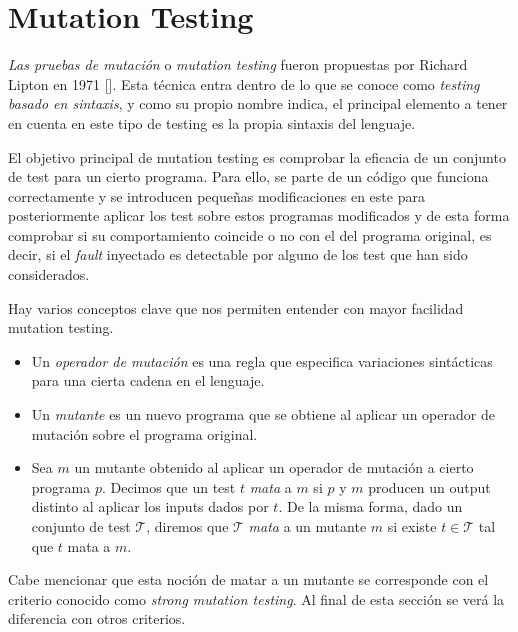\section{Mutation Testing}

\textit{Las pruebas de mutación} o \textit{mutation testing} fueron propuestas por Richard Lipton en 1971 [\cite{lipton1971fault}]. Esta técnica entra dentro de lo que se conoce como \textit{testing basado en sintaxis}, y como su propio nombre indica, el principal elemento a tener en cuenta en este tipo de testing es la propia sintaxis del lenguaje.

El objetivo principal de mutation testing es comprobar la eficacia de un conjunto de test para un cierto programa. Para ello, se parte de un código que funciona correctamente y se introducen pequeñas modificaciones en este para posteriormente aplicar los test sobre estos programas modificados y de esta forma comprobar si su comportamiento coincide o no con el del programa original, es decir, si el \textit{fault} inyectado es detectable por alguno de los test que han sido considerados.

Hay  varios conceptos clave que nos permiten entender con mayor facilidad mutation testing. 

\begin{itemize}
\item Un \emph{operador de mutación} es una regla que especifica variaciones sintácticas para una cierta cadena en el lenguaje.
%
\item Un \emph{mutante} es un nuevo programa que se obtiene al aplicar un operador de mutación sobre el programa original.
%
\item Sea $m$ un mutante obtenido al aplicar un operador de mutación a cierto programa $p$. Decimos que un test $t$ \emph{mata} a $m$ si $p$ y $m$ producen un output distinto al aplicar los inputs dados por $t$. De la misma forma, dado un conjunto de test $\mathcal{T}$, diremos que $\mathcal{T}$ \textit{mata} a un mutante $m$ si existe $t\in \mathcal{T}$ tal que $t$ mata a $m$.
\end{itemize}

Cabe mencionar que esta noción de matar a un mutante se corresponde con el criterio conocido como \textit{strong mutation testing}. Al final de esta sección se verá la diferencia con otros criterios.





